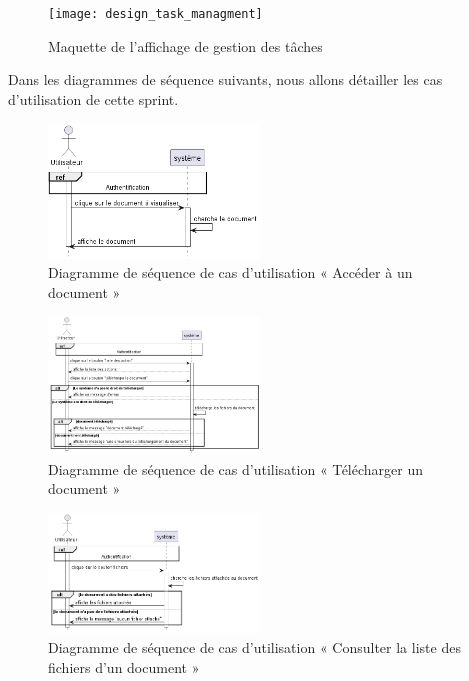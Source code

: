\begin{figure}[H]
  \centering
  \texttt{[image: design\_task\_managment]}
  \caption{Maquette de l'affichage de gestion des tâches}
  \label{fig:design_manage_tasks}
\end{figure}

Dans les diagrammes de séquence suivants, nous allons détailler les cas d'utilisation de cette sprint.\\

\begin{figure}[H]
  \centering
  \includegraphics[width=0.5\textwidth]{out/diagrams/documents/preview/preview_document}
  \caption{Diagramme de séquence de cas d'utilisation « Accéder à un document  »}
  \label{fig:sequence_Accederaundocument}
\end{figure}
\begin{figure}[H]
  \centering
  \includegraphics[width=0.5\textwidth]{out/diagrams/documents/download/download}
  \caption{Diagramme de séquence de cas d'utilisation « Télécharger un document  »}
  \label{fig:sequence_telechargerundocument}
\end{figure}
\begin{figure}[H]
  \centering
  \includegraphics[width=0.5\textwidth]{out/diagrams/documents/previewFiles/preview_files_document}
  \caption{Diagramme de séquence de cas d'utilisation « Consulter la liste des fichiers d'un document  »}
  \label{fig:sequence_previewFiles}
\end{figure}
